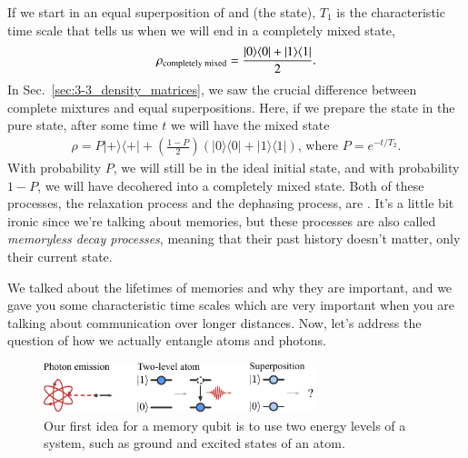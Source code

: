 If we start in an equal superposition of  and  (the \ket{+} state), $T_1$ is the characteristic time scale that tells us when we will end in a completely mixed state,
\begin{equation}
\begin{aligned}
\rho_{\textrm{completely mixed}} =\frac{|0 \rangle \langle 0|+|1 \rangle \langle 1|}{2}.
\end{aligned}
\end{equation}
In Sec.~\ref{sec:3-3_density_matrices}, we saw the crucial difference between complete mixtures and equal superpositions. Here, if we prepare the state in the pure state, after some time $t$ we will have the mixed state
\begin{equation}
\begin{aligned}
\rho=P|+\rangle\langle+|+\left(\frac{1-P}{2}\right)(|0\rangle\langle 0|+| 1\rangle\langle 1|)\text{, where }  P=e^{-t / T_2}.
\end{aligned}
\end{equation}
With probability $P$, we will still be in the ideal initial state, and with probability $1-P$, we will have decohered into a completely mixed state. Both of these processes, the relaxation process and the dephasing process, are . It's a little bit ironic since we're talking about memories, but these processes are also called \emph{memoryless decay processes}, meaning that their past history doesn't matter, only their current state.

We talked about the lifetimes of memories and why they are important, and we gave you some characteristic time scales which are very important when you are talking about communication over longer distances. Now, let's address the question of how we actually entangle atoms and photons.

\begin{figure}[t]
    \centering
    \includegraphics[width=0.7\textwidth]{lesson13/13-4_memory-first.pdf}
    \caption[First idea for memory]{Our first idea for a memory qubit is to use two energy levels of a system, such as ground and excited states of an atom.}
    \label{fig:13-memory-first}
\end{figure}


